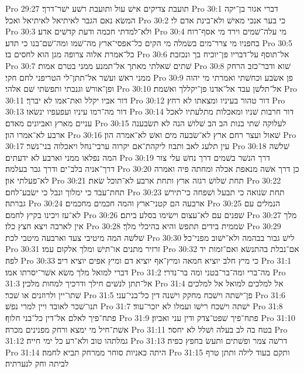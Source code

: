 Pro 29:27  תועבת צדיקים אישׁ עול ותועבת רשׁע ישׁר־דרך׃
Pro 30:1  דברי אגור בן־יקה המשׂא נאם הגבר לאיתיאל לאיתיאל ואכל׃
Pro 30:2  כי בער אנכי מאישׁ ולא־בינת אדם לי׃
Pro 30:3  ולא־למדתי חכמה ודעת קדשׁים אדע׃
Pro 30:4  מי עלה־שׁמים וירד מי אסף־רוח בחפניו מי צרר־מים בשׂמלה מי הקים כל־אפסי־ארץ מה־שׁמו ומה־שׁם־בנו כי תדע׃
Pro 30:5  כל־אמרת אלוה צרופה מגן הוא לחסים בו׃
Pro 30:6  אל־תוסף על־דבריו פן־יוכיח בך ונכזבת׃
Pro 30:7  שׁתים שׁאלתי מאתך אל־תמנע ממני בטרם אמות׃
Pro 30:8  שׁוא ודבר־כזב הרחק ממני ראשׁ ועשׁר אל־תתן־לי הטריפני לחם חקי׃
Pro 30:9  פן אשׂבע וכחשׁתי ואמרתי מי יהוה ופן־אורשׁ וגנבתי ותפשׂתי שׁם אלהי׃
Pro 30:10  אל־תלשׁן עבד אל־אדנו פן־יקללך ואשׁמת׃
Pro 30:11  דור אביו יקלל ואת־אמו לא יברך׃
Pro 30:12  דור טהור בעיניו ומצאתו לא רחץ׃
Pro 30:13  דור מה־רמו עיניו ועפעפיו ינשׂאו׃
Pro 30:14  דור חרבות שׁניו ומאכלות מתלעתיו לאכל עניים מארץ ואביונים מאדם׃
Pro 30:15  לעלוקה שׁתי בנות הב הב שׁלושׁ הנה לא תשׂבענה ארבע לא־אמרו הון׃
Pro 30:16  שׁאול ועצר רחם ארץ לא־שׂבעה מים ואשׁ לא־אמרה הון׃
Pro 30:17  עין תלעג לאב ותבוז ליקהת־אם יקרוה ערבי־נחל ויאכלוה בני־נשׁר׃
Pro 30:18  שׁלשׁה המה נפלאו ממני וארבע לא ידעתים׃
Pro 30:19  דרך הנשׁר בשׁמים דרך נחשׁ עלי צור דרך־אניה בלב־ים ודרך גבר בעלמה׃
Pro 30:20  כן דרך אשׁה מנאפת אכלה ומחתה פיה ואמרה לא־פעלתי און׃
Pro 30:21  תחת שׁלושׁ רגזה ארץ ותחת ארבע לא־תוכל שׂאת׃
Pro 30:22  תחת־עבד כי ימלוך ונבל כי ישׂבע־לחם׃
Pro 30:23  תחת שׂנואה כי תבעל ושׁפחה כי־תירשׁ גברתה׃
Pro 30:24  ארבעה הם קטני־ארץ והמה חכמים מחכמים׃
Pro 30:25  הנמלים עם לא־עז ויכינו בקיץ לחמם׃
Pro 30:26  שׁפנים עם לא־עצום וישׂימו בסלע ביתם׃
Pro 30:27  מלך אין לארבה ויצא חצץ כלו׃
Pro 30:28  שׂממית בידים תתפשׂ והיא בהיכלי מלך׃
Pro 30:29  שׁלשׁה המה מיטיבי צעד וארבעה מיטבי לכת׃
Pro 30:30  לישׁ גבור בבהמה ולא־ישׁוב מפני־כל׃
Pro 30:31  זרזיר מתנים או־תישׁ ומלך אלקום עמו׃
Pro 30:32  אם־נבלת בהתנשׂא ואם־זמות יד לפה׃
Pro 30:33  כי מיץ חלב יוציא חמאה ומיץ־אף יוציא דם ומיץ אפים יוציא ריב׃
Pro 31:1  דברי למואל מלך משׂא אשׁר־יסרתו אמו׃
Pro 31:2  מה־ברי ומה־בר־בטני ומה בר־נדרי׃
Pro 31:3  אל־תתן לנשׁים חילך ודרכיך למחות מלכין׃
Pro 31:4  אל למלכים למואל אל למלכים שׁתו־יין ולרוזנים או שׁכר׃
Pro 31:5  פן־ישׁתה וישׁכח מחקק וישׁנה דין כל־בני־עני׃
Pro 31:6  תנו־שׁכר לאובד ויין למרי נפשׁ׃
Pro 31:7  ישׁתה וישׁכח רישׁו ועמלו לא יזכר־עוד׃
Pro 31:8  פתח־פיך לאלם אל־דין כל־בני חלוף׃
Pro 31:9  פתח־פיך שׁפט־צדק ודין עני ואביון׃
Pro 31:10  אשׁת־חיל מי ימצא ורחק מפנינים מכרה׃
Pro 31:11  בטח בה לב בעלה ושׁלל לא יחסר׃
Pro 31:12  גמלתהו טוב ולא־רע כל ימי חייה׃
Pro 31:13  דרשׁה צמר ופשׁתים ותעשׂ בחפץ כפיה׃
Pro 31:14  היתה כאניות סוחר ממרחק תביא לחמה׃
Pro 31:15  ותקם בעוד לילה ותתן טרף לביתה וחק לנערתיה׃

